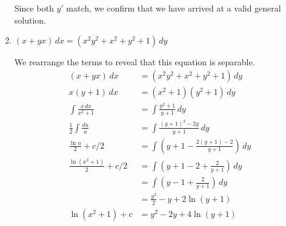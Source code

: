 \documentclass[../hw5]{subfiles}
\begin{document}
\begin{enumerate}[label= (\alph*)]
    Since both $y'$ match, we confirm that we have arrived at a valid general solution.

    \item $(x+yx)\,dx=(x^2y^2+x^2+y^2+1)\,dy$
    
    We rearrange the terms to reveal that this equation is separable.
    \begin{align*}
        (x+yx)\,dx&=(x^2y^2+x^2+y^2+1)\,dy \\
        x(y+1)\,dx&=(x^2+1)(y^2+1)\,dy \\
        \int\frac{x\,dx}{x^2+1}&=\int\frac{y^2+1}{y+1}\,dy \\
        \frac{1}{2}\int\frac{du}{u}&=\int\frac{{(y+1)}^2-2y}{y+1}\,dy \\
        \frac{\ln{u}}{2}+c/2&=\int\left( y+1-\frac{2(y+1)-2}{y+1} \right)\,dy \\
        \frac{\ln{(x^2+1)}}{2}+c/2&=\int\left( y+1-2+\frac{2}{y+1} \right)\,dy\\
        &=\int\left(y-1+\frac{2}{y+1}\right)\,dy \\
        &=\frac{y^2}{2}-y+2\ln{(y+1)} \\
        \ln{(x^2+1)}+c&=y^2-2y+4\ln{(y+1)} \\
    \end{align*}

\end{enumerate}
\end{document}
